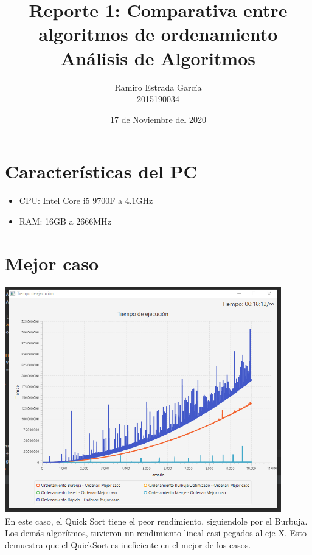 \documentclass{article}
\title{Reporte 1: Comparativa entre algoritmos de ordenamiento\\\textbf{Análisis de Algoritmos}}
\author{ Ramiro Estrada García\\2015190034 }
\date{17 de Noviembre del 2020}
\begin{document}
\maketitle
\vspace{5cm}
\section {Características del PC}
\begin{itemize}
	\item CPU: Intel Core i5 9700F a 4.1GHz
	\item RAM: 16GB a 2666MHz
\end{itemize}
\newpage
\maketitle
\section{Mejor caso}
\includegraphics[width=12cm]{mejor.png}\\
En este caso, el Quick Sort tiene el peor rendimiento, siguiendole por el Burbuja. Los demás algorítmos, tuvieron un rendimiento 
lineal casi pegados al eje X. Esto demuestra que el QuickSort es ineficiente en el mejor de los casos.
\maketitle
\end{document}
